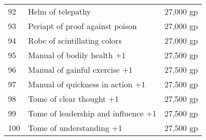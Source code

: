 \begin{xtabular}{lll}
92  & Helm of telepathy                           & 27,000 gp    \\
93  & Periapt of proof against poison             & 27,000 gp    \\
94  & Robe of scintillating colors                & 27,000 gp    \\
95  & Manual of bodily health +1                  & 27,500 gp    \\
96  & Manual of gainful exercise +1               & 27,500 gp    \\
97  & Manual of quickness in action +1            & 27,500 gp    \\
98  & Tome of clear thought +1                    & 27,500 gp    \\
99  & Tome of leadership and influence +1         & 27,500 gp    \\
100 & Tome of understanding +1                    & 27,500 gp   
\end{xtabular}

